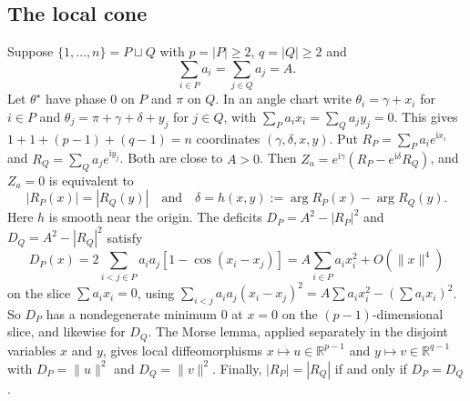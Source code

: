 \documentclass[11pt,a4paper]{article}
\theoremstyle{definition}\newtheorem{conjecture}{Conjecture}
\theoremstyle{remark}\newtheorem{remark}[theorem]{Remark}
\newcommand{\R}{\mathbb R}
\newcommand{\ii}{\mathrm{i}}
\begin{document}
\subsection{The local cone}
Suppose $\{1,\dots,n\}=P\sqcup Q$ with $p=|P|\ge2$, $q=|Q|\ge2$ and
\begin{equation}\label{eq:partition}
 \textstyle\sum_{i\in P}a_i=\sum_{j\in Q}a_j=A .
\end{equation}
Let $\theta^\star$ have phase $0$ on $P$ and $\pi$ on $Q$. In an angle chart write $\theta_i=\gamma+x_i$ for $i\in P$ and $\theta_j=\pi+\gamma+\delta+y_j$ for $j\in Q$, with $\sum_Pa_ix_i=\sum_Qa_jy_j=0$. This gives $1+1+(p-1)+(q-1)=n$ coordinates $(\gamma,\delta,x,y)$. Put $R_P=\sum_Pa_ie^{\ii x_i}$ and $R_Q=\sum_Qa_je^{\ii y_j}$. Both are close to $A>0$. Then $Z_a=e^{\ii\gamma}(R_P-e^{\ii\delta}R_Q)$, and $Z_a=0$ is equivalent to
\[
 |R_P(x)|=|R_Q(y)|\quad\text{and}\quad \delta=h(x,y):=\arg R_P(x)-\arg R_Q(y).
\]
Here $h$ is smooth near the origin. The deficits $D_P=A^2-|R_P|^2$ and $D_Q=A^2-|R_Q|^2$ satisfy
\begin{equation}\label{eq:deficit}
 D_P(x)=2\sum_{i<j\in P}a_ia_j[1-\cos(x_i-x_j)]=A\sum_{i\in P}a_ix_i^2+O(\|x\|^4)
\end{equation}
on the slice $\sum a_ix_i=0$, using $\sum_{i<j}a_ia_j(x_i-x_j)^2=A\sum a_ix_i^2-(\sum a_ix_i)^2$. So $D_P$ has a nondegenerate minimum $0$ at $x=0$ on the $(p-1)$-dimensional slice, and likewise for $D_Q$. The Morse lemma, applied separately in the disjoint variables $x$ and $y$, gives local diffeomorphisms $x\mapsto u\in\R^{p-1}$ and $y\mapsto v\in\R^{q-1}$ with $D_P=\|u\|^2$ and $D_Q=\|v\|^2$. Finally, $|R_P|=|R_Q|$ if and only if $D_P=D_Q$.
\end{document}
